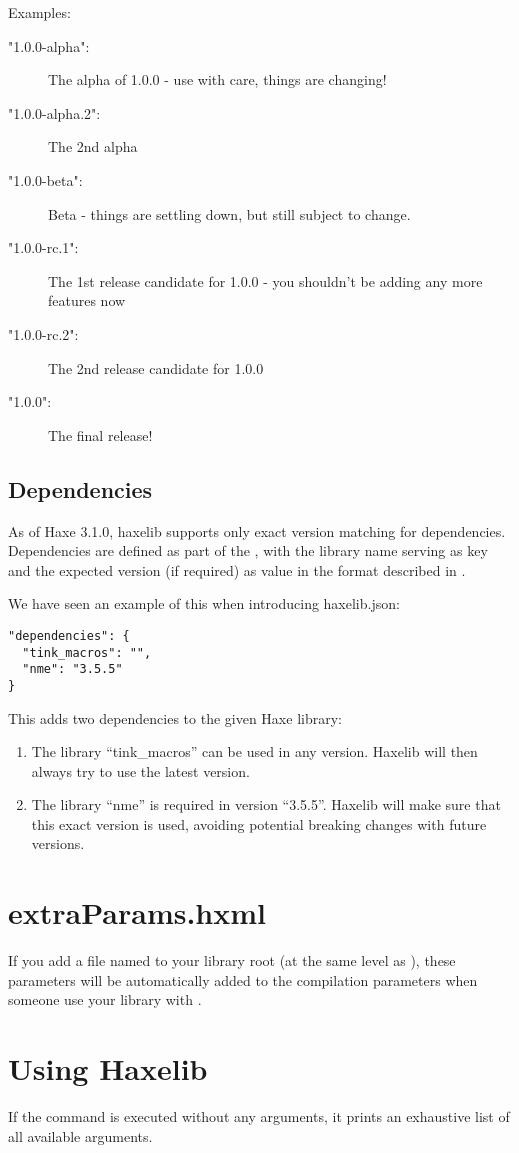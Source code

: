 Examples:

\begin{description}
\item["1.0.0-alpha":] The alpha of 1.0.0 - use with care, things are changing!
\item["1.0.0-alpha.2":] The 2nd alpha
\item["1.0.0-beta":] Beta - things are settling down, but still subject to change.
\item["1.0.0-rc.1":] The 1st release candidate for 1.0.0 - you shouldn't be adding any more features now
\item["1.0.0-rc.2":] The 2nd release candidate for 1.0.0
\item["1.0.0":] The final release!  
\end{description}


\subsection{Dependencies}
\label{haxelib-json-dependencies}

As of Haxe 3.1.0, haxelib supports only exact version matching for dependencies. Dependencies are defined as part of the , with the library name serving as key and the expected version (if required) as value in the format described in .

We have seen an example of this when introducing haxelib.json:

\begin{lstlisting}
"dependencies": {
  "tink_macros": "",
  "nme": "3.5.5"
}
\end{lstlisting}

This adds two dependencies to the given Haxe library:

\begin{enumerate}
	\item The library ``tink_macros'' can be used in any version. Haxelib will then always try to use the latest version.
	\item The library ``nme'' is required in version ``3.5.5''. Haxelib will make sure that this exact version is used, avoiding potential breaking changes with future versions.
\end{enumerate}


\section{extraParams.hxml}
\label{haxelib-extraParams}

If you add a file named  to your library root (at the same level as ), these parameters will be automatically added to the compilation parameters when someone use your library with .


\section{Using Haxelib}
\label{haxelib-using}

If the  command is executed without any arguments, it prints an exhaustive list of all available arguments.
